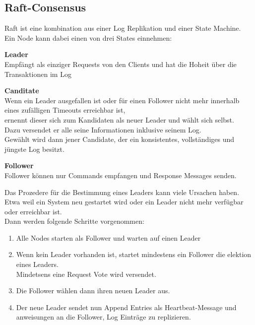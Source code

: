 
\begin{flushleft}
    \subsection{Raft-Consensus}
    \label{subsec:mraft_consensus}
    Raft ist eine kombination aus einer Log Replikation und einer \Gls{State Machine}\cite{529SHBCA}.\\
    Ein Node kann dabei einen von drei States einnehmen:\\
    \begin{description}
        \item \textbf{Leader}\hfill \\Empfängt als einziger Requests von den Clients und hat die Hoheit über die Transaktionen im Log
        \item \textbf{Canditate}\hfill \\Wenn ein Leader ausgefallen ist oder für einen Follower nicht mehr innerhalb eines zufälligen Timeouts erreichbar ist,\\ernennt dieser sich zum Kandidaten als neuer Leader und wählt sich selbst.\\Dazu versendet er alle seine Informationen inklusive seinem Log.\\Gewählt wird dann jener Candidate, der ein konsistentes, vollständiges und jüngste Log besitzt.
        \item \textbf{Follower}\hfill \\Follower können nur Commands empfangen und Response Messages senden.
    \end{description}
\end{flushleft}
\begin{flushleft}
    Das Prozedere für die Bestimmung eines Leaders kann viele Ursachen haben.\\
    Etwa weil ein System neu gestartet wird oder ein Leader nicht mehr verfügbar oder erreichbar ist.\\
    Dann werden folgende Schritte vorgenommen:
    \begin{enumerate}
        \item Alle Nodes starten als Follower und warten auf einen Leader
        \item Wenn kein Leader vorhanden ist, startet mindestens ein Follower die elektion eines Leaders.\\Mindetsens eine Request Vote wird versendet.
        \item Die Follower wählen dann ihren neuen Leader aus.
        \item Der neue Leader sendet nun Append Entries als Heartbeat-Message und anweisungen an die Follower, Log Einträge zu replizieren.
    \end{enumerate}
\end{flushleft}
